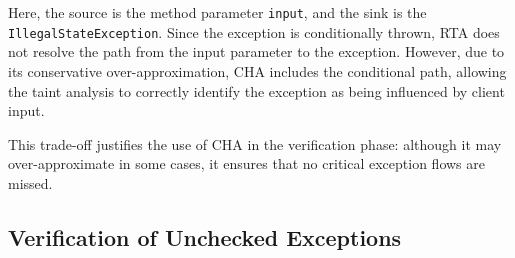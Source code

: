 Here, the source is the method parameter \texttt{input}, and the sink is the \texttt{IllegalStateException}. Since the exception is conditionally thrown, RTA does not resolve the path from the input parameter to the exception. However, due to its conservative over-approximation, CHA includes the conditional path, allowing the taint analysis to correctly identify the exception as being influenced by client input.

This trade-off justifies the use of CHA in the verification phase: although it may over-approximate in some cases, it ensures that no critical exception flows are missed.


\subsection{Verification of Unchecked Exceptions}
